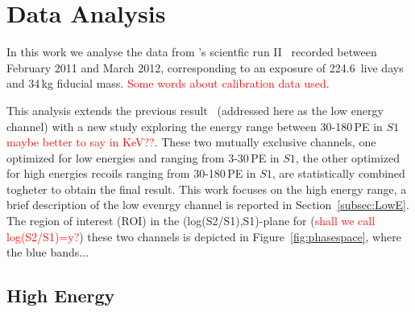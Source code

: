 \section{Data Analysis}
\label{sec:Analysis}
In this work we analyse the data from \Xehund's scientfic run II~\cite{xe100_run10_si,xe100_run10_sd} recorded between February 2011 and March 2012, 
corresponding to an exposure of 224.6~live days and 34\,kg fiducial mass. \textcolor{red}{Some words about calibration data used}.

This analysis extends the previous result~\cite{} (addressed here as the low energy channel) 
with a new study exploring the energy range between 30-180\,PE in $S1$ \textcolor{red}{maybe better to say in KeV??}. 
These two mutually exclusive channels, one optimized for low energies and ranging from 3-30\,PE in $S1$, the other optimized for high energies recoils
ranging from 30-180\,PE in $S1$, are statistically combined togheter to obtain the final result. 
This work focuses on the high energy range, a brief description of the low evenrgy channel is reported in Section~\ref{subsec:LowE}.
The region of interest (ROI) in the (log(S2/S1),S1)-plane for (\textcolor{red}{shall we call log(S2/S1)=y?}) 
these two channels is depicted in Figure~\ref{fig:phasespace}, where the blue bands...



\subsection{High Energy}
\label{subsubsec:HighE}


